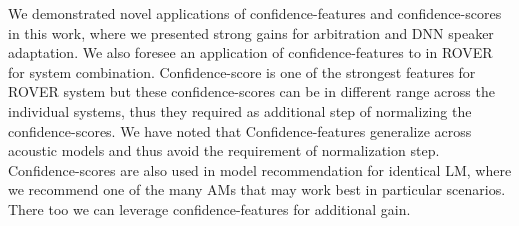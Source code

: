 We demonstrated novel applications of confidence-features and confidence-scores in this work, where we presented strong gains for arbitration and DNN speaker adaptation. We also foresee an application of confidence-features to in ROVER for system combination. Confidence-score is one of the strongest features for  ROVER system but these confidence-scores can be in different range across the individual systems, thus they required as additional step of normalizing the confidence-scores. We have noted that Confidence-features generalize across acoustic models and thus avoid the requirement of normalization step. Confidence-scores are also used in model recommendation for identical LM, where we recommend one of the many AMs that may work best in particular scenarios. There too we can leverage confidence-features for additional gain.
